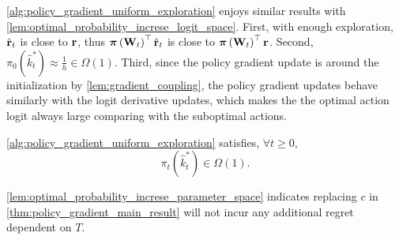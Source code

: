 \cref{alg:policy_gradient_uniform_exploration} enjoys similar results with \cref{lem:optimal_probability_increse_logit_space}. First, with enough exploration, $\hat{{\mathbf{r}}}_t$ is close to ${\mathbf{r}}$, thus ${\boldsymbol{\pi}}\left({\mathbf{W}}_t\right)^\top \hat{{\mathbf{r}}}_t$ is close to ${\boldsymbol{\pi}}\left({\mathbf{W}}_t\right)^\top {\mathbf{r}}$. Second, $\pi_{0}(\hat{k}_t^*) \approx \frac{1}{h} \in \Omega(1)$. Third, since the policy gradient update is around the initialization by \cref{lem:gradient_coupling}, the policy gradient updates behave similarly with the logit derivative updates, which makes the the optimal action logit always large comparing with the suboptimal actions.
\begin{lem}
\label{lem:optimal_probability_increse_parameter_space}
\cref{alg:policy_gradient_uniform_exploration} satisfies, $\forall t \ge 0$,
\begin{equation*}
    \pi_{t}(\hat{k}_t^*) \in \Omega(1).
\end{equation*}
\end{lem}
\cref{lem:optimal_probability_increse_parameter_space} indicates replacing $c$ in \cref{thm:policy_gradient_main_result} will not incur any additional regret dependent on $T$.